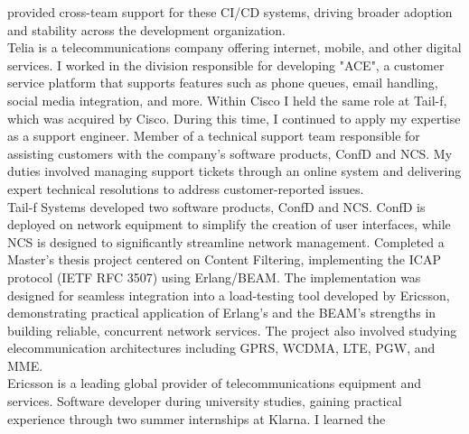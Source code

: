 \documentclass[purpleprocv]{procv}
\begin{document}
\begin{procv-twocolumns}
{{          provided cross-team support for these CI/CD systems, driving 
          broader adoption and stability across the development organization.
          \\[3pt]
          Telia is a telecommunications company offering internet, mobile, and other digital services. I worked 
          in the division responsible for developing "ACE", a customer service platform that supports features 
          such as phone queues, email handling, social media integration, and more.}
          {Within Cisco I held the same role at Tail-f, which was acquired by Cisco. During this time, 
          I continued to apply my expertise as a support engineer.}
          {Member of a technical support team responsible for assisting customers with the company’s software 
          products, ConfD and NCS. My duties involved managing support tickets through an online system and delivering expert 
          technical resolutions to address customer-reported issues.
          \\[3pt]
          Tail-f Systems developed two software products, ConfD and NCS. ConfD is deployed on network equipment to simplify 
          the creation of user interfaces, while NCS is designed to significantly streamline network management.}
          {Completed a Master’s thesis project centered on Content Filtering, implementing the ICAP protocol (IETF RFC 3507) 
          using Erlang/BEAM. The implementation was designed for seamless integration into a load-testing tool developed by 
          Ericsson, demonstrating practical application of Erlang’s and the BEAM’s strengths in building reliable, concurrent 
          network services. The project also involved studying elecommunication architectures including GPRS, WCDMA, 
          LTE, PGW, and MME.
          \\[3pt]
          Ericsson is a leading global provider of telecommunications equipment and services.}
          {Software developer during university studies, gaining practical experience through two summer internships at Klarna. I learned the
}}
\end{procv-twocolumns}
\end{document}
